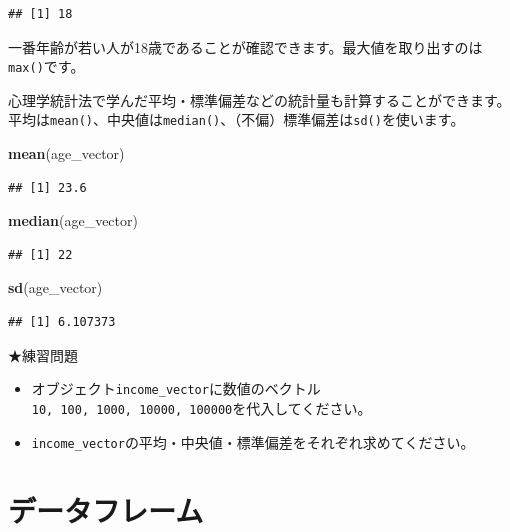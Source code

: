 \documentclass[]{book}
\newenvironment{Shaded}{\begin{snugshade}}{\end{snugshade}}
\newcommand{\KeywordTok}[1]{\textcolor[rgb]{0.13,0.29,0.53}{\textbf{#1}}}
\newcommand{\NormalTok}[1]{#1}
\providecommand{\tightlist}{%
  \setlength{\itemsep}{0pt}\setlength{\parskip}{0pt}}
\begin{document}
\begin{verbatim}
## [1] 18
\end{verbatim}

一番年齢が若い人が18歳であることが確認できます。最大値を取り出すのは\texttt{max()}です。

心理学統計法で学んだ平均・標準偏差などの統計量も計算することができます。平均は\texttt{mean()}、中央値は\texttt{median()}、（不偏）標準偏差は\texttt{sd()}を使います。

\begin{Shaded}
\begin{Highlighting}[]
\KeywordTok{mean}\NormalTok{(age_vector)}
\end{Highlighting}
\end{Shaded}

\begin{verbatim}
## [1] 23.6
\end{verbatim}

\begin{Shaded}
\begin{Highlighting}[]
\KeywordTok{median}\NormalTok{(age_vector)}
\end{Highlighting}
\end{Shaded}

\begin{verbatim}
## [1] 22
\end{verbatim}

\begin{Shaded}
\begin{Highlighting}[]
\KeywordTok{sd}\NormalTok{(age_vector)}
\end{Highlighting}
\end{Shaded}

\begin{verbatim}
## [1] 6.107373
\end{verbatim}

★練習問題

\begin{itemize}
\tightlist
\item
  オブジェクト\texttt{income\_vector}に数値のベクトル\texttt{10,\ 100,\ 1000,\ 10000,\ 100000}を代入してください。
\item
  \texttt{income\_vector}の平均・中央値・標準偏差をそれぞれ求めてください。
\end{itemize}

\section{データフレーム}\label{ux30c7ux30fcux30bfux30d5ux30ecux30fcux30e0}
\end{document}
